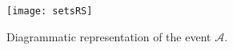 \documentclass[12pt, twoside,a4paper,reqno]{amsart}
\theoremstyle{plain}
\theoremstyle{remark}
\theoremstyle{definition}
\begin{document}
\begin{figure}[htbp]
  \centering
  \texttt{[image: setsRS]}
  \caption{Diagrammatic representation of the event $\mathcal
    A$.}
  \label{fig:1}
\end{figure}
\end{document}
